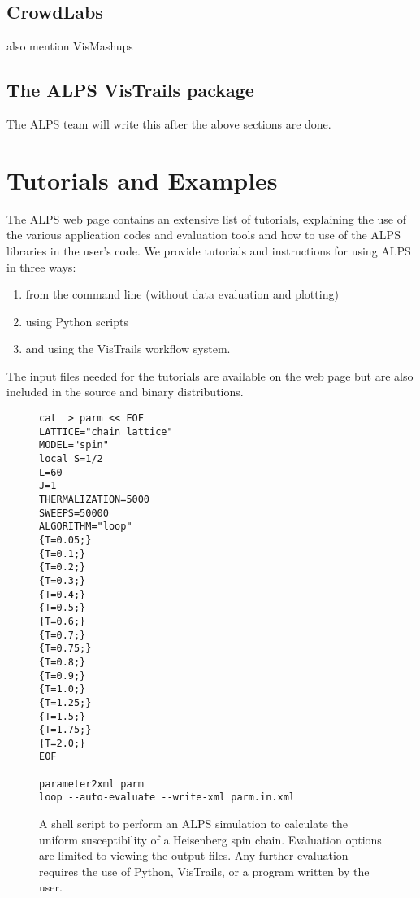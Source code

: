 \documentclass[12pt]{iopart}
\begin{document}
\subsection{CrowdLabs}
also mention VisMashups
\subsection{The ALPS VisTrails package}
The ALPS team will write this after the above sections are done.
\section{Tutorials and Examples}

The ALPS web page \cite{alps} contains an extensive list of tutorials, explaining the use of the various application codes and evaluation tools and how to use of the ALPS libraries in the user's code. We provide tutorials and instructions for using ALPS in three ways: 
\begin{enumerate}
\item from the command line (without data evaluation and plotting)
\item using Python scripts
\item and using the VisTrails workflow system. 
\end{enumerate}

The input files needed for the tutorials are available on the web page but are also included in the source and binary distributions.

\begin{figure}
\begin{tiny}
\begin{center}
\begin{verbatim}
cat  > parm << EOF
LATTICE="chain lattice"
MODEL="spin"
local_S=1/2
L=60
J=1
THERMALIZATION=5000
SWEEPS=50000
ALGORITHM="loop"
{T=0.05;}
{T=0.1;}
{T=0.2;}
{T=0.3;}
{T=0.4;}
{T=0.5;}
{T=0.6;}
{T=0.7;}
{T=0.75;}
{T=0.8;}
{T=0.9;}
{T=1.0;}
{T=1.25;}
{T=1.5;}
{T=1.75;}
{T=2.0;}
EOF

parameter2xml parm
loop --auto-evaluate --write-xml parm.in.xml
\end{verbatim}
\end{center}
\end{tiny}
\caption{A shell script to perform an ALPS simulation to calculate the uniform susceptibility of a Heisenberg spin chain. Evaluation options are limited to viewing the output files. Any further evaluation requires the use of Python, VisTrails, or a program written by the user.}
\label{fig:commandline}
\end{figure}
\end{document}
